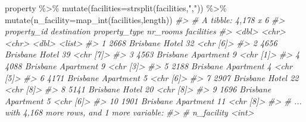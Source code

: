 \documentclass[
]{article}
\newenvironment{Shaded}{\begin{snugshade}}{\end{snugshade}}
\newcommand{\AttributeTok}[1]{\textcolor[rgb]{0.77,0.63,0.00}{#1}}
\newcommand{\CommentTok}[1]{\textcolor[rgb]{0.56,0.35,0.01}{\textit{#1}}}
\newcommand{\FunctionTok}[1]{\textcolor[rgb]{0.00,0.00,0.00}{#1}}
\newcommand{\NormalTok}[1]{#1}
\newcommand{\SpecialCharTok}[1]{\textcolor[rgb]{0.00,0.00,0.00}{#1}}
\newcommand{\StringTok}[1]{\textcolor[rgb]{0.31,0.60,0.02}{#1}}
\begin{document}
\begin{Shaded}
\begin{Highlighting}[]
\NormalTok{property }\SpecialCharTok{\%\textgreater{}\%}
  \FunctionTok{mutate}\NormalTok{(}\AttributeTok{facilities=}\FunctionTok{strsplit}\NormalTok{(facilities,}\StringTok{","}\NormalTok{)) }\SpecialCharTok{\%\textgreater{}\%} 
  \FunctionTok{mutate}\NormalTok{(}\AttributeTok{n\_facility=}\FunctionTok{map\_int}\NormalTok{(facilities,length))}
\CommentTok{\#\textgreater{} \# A tibble: 4,178 x 6}
\CommentTok{\#\textgreater{}    property\_id destination property\_type nr\_rooms facilities}
\CommentTok{\#\textgreater{}          \textless{}dbl\textgreater{} \textless{}chr\textgreater{}       \textless{}chr\textgreater{}            \textless{}dbl\textgreater{} \textless{}list\textgreater{}    }
\CommentTok{\#\textgreater{}  1        2668 Brisbane    Hotel               32 \textless{}chr [6]\textgreater{} }
\CommentTok{\#\textgreater{}  2        4656 Brisbane    Hotel               39 \textless{}chr [7]\textgreater{} }
\CommentTok{\#\textgreater{}  3        4563 Brisbane    Apartment            9 \textless{}chr [1]\textgreater{} }
\CommentTok{\#\textgreater{}  4        4088 Brisbane    Apartment            9 \textless{}chr [3]\textgreater{} }
\CommentTok{\#\textgreater{}  5        2188 Brisbane    Apartment            4 \textless{}chr [5]\textgreater{} }
\CommentTok{\#\textgreater{}  6        4171 Brisbane    Apartment            5 \textless{}chr [6]\textgreater{} }
\CommentTok{\#\textgreater{}  7        2907 Brisbane    Hotel               22 \textless{}chr [8]\textgreater{} }
\CommentTok{\#\textgreater{}  8        5141 Brisbane    Hotel               20 \textless{}chr [8]\textgreater{} }
\CommentTok{\#\textgreater{}  9        1696 Brisbane    Apartment            5 \textless{}chr [6]\textgreater{} }
\CommentTok{\#\textgreater{} 10        1901 Brisbane    Apartment           11 \textless{}chr [8]\textgreater{} }
\CommentTok{\#\textgreater{} \# ... with 4,168 more rows, and 1 more variable:}
\CommentTok{\#\textgreater{} \#   n\_facility \textless{}int\textgreater{}}
\end{Highlighting}
\end{Shaded}
\end{document}
